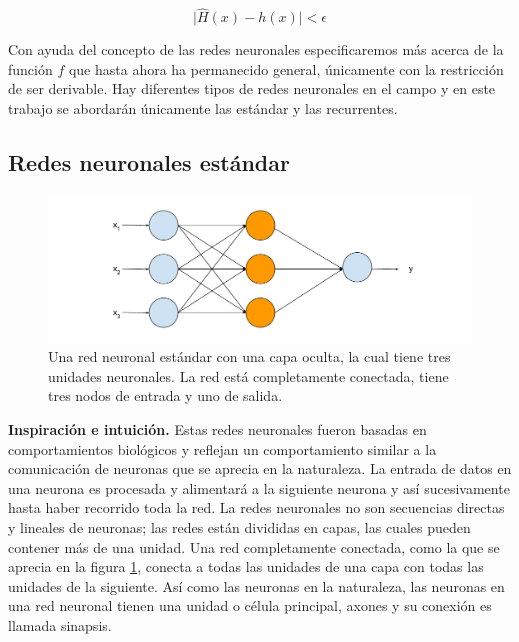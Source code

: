 \begin{equation}
\label{eq:universaltheorem}
\vert \hat{H}(x) - h(x) \vert < \epsilon
\end{equation}

Con ayuda del concepto de las redes neuronales especificaremos más acerca de la función $f$ que hasta ahora ha permanecido general, únicamente con la restricción de ser derivable. Hay diferentes tipos de redes neuronales en el campo y en este trabajo se abordarán únicamente las estándar y las recurrentes.

\subsection{Redes neuronales estándar}

\begin{figure}
	\includegraphics[scale=.6]{Figures/standardnn.pdf}
	\caption{Una red neuronal estándar con una capa oculta, la cual tiene tres unidades neuronales. La red está completamente conectada, tiene tres nodos de entrada y uno de salida.}
	\label{fig:standardnn}
\end{figure}

\textbf{Inspiración e intuición.} Estas redes neuronales fueron basadas en comportamientos biológicos y reflejan un comportamiento similar a la comunicación de neuronas que se aprecia en la naturaleza. La entrada de datos en una neurona es procesada y alimentará a la siguiente neurona y así sucesivamente hasta haber recorrido toda la red. La redes neuronales no son secuencias directas y lineales de neuronas; las redes están divididas en capas, las cuales pueden contener más de una unidad. Una red completamente conectada, como la que se aprecia en la figura \ref{fig:standardnn}, conecta a todas las unidades de una capa con todas las unidades de la siguiente. Así como las neuronas en la naturaleza, las neuronas en una red neuronal tienen una unidad o célula principal, axones y su conexión es llamada sinapsis.

